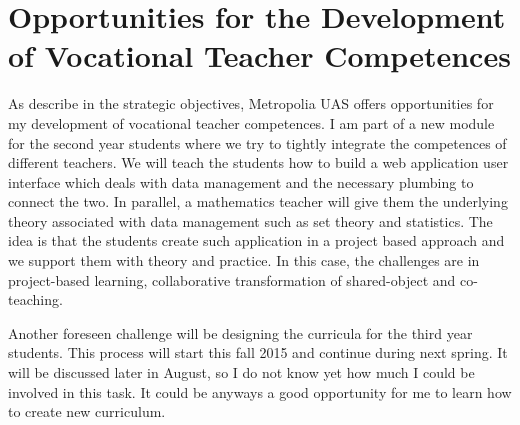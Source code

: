 \section{Opportunities for the Development of Vocational Teacher Competences}
  
As describe in the strategic objectives, Metropolia UAS offers opportunities for my development of vocational teacher competences. 
I am part of a new module for the second year students where we try to tightly integrate the competences of different teachers. 
We will teach the students how to build a web application user interface which deals with data management and the necessary plumbing to connect the two.
In parallel, a mathematics teacher will give them the underlying theory associated with data management such as set theory and statistics.
The idea is that the students create such application in a project based approach and we support them with theory and practice.
In this case, the challenges are in project-based learning, collaborative transformation of shared-object and co-teaching.

Another foreseen challenge will be designing the curricula for the third year students.
This process will start this fall 2015 and continue during next spring. 
It will be discussed later in August, so I do not know yet how much I could be involved in this task. 
It could be anyways a good opportunity for me to learn how to create new curriculum.
